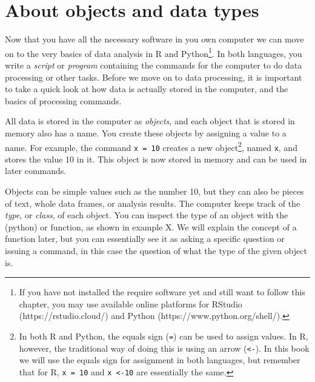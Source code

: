 \newcommand{\fnarrow}{\footnote{In both R and Python, the equals
  sign (\texttt{=}) can be used to assign values. In R, however, the
  traditional way of doing this is using an arrow (\texttt{\textless-}). In
  this book we will use the equals sign for assignment in both
  languages, but remember that for R, \texttt{x = 10} and
  \texttt{x \textless-10} are essentially the same.}}


\section{About objects and data types}
\label{sec:datatypes}

Now that you have all the necessary software in you own computer we
can move on to the very basics of data analysis in R and
Python\footnote{If you have not installed the require software yet and
  still want to follow this chapter, you may use available online
  platforms for RStudio (https://rstudio.cloud/) and Python
  (https://www.python.org/shell/).}.  In both languages, you write a
\emph{script} or \emph{program} containing the commands for the
computer to do data processing or other tasks.  Before we move on to
data processing, it is important to take a quick look at how data is
actually stored in the computer, and the basics of processing
commands.

All data is stored in the computer as \emph{objects}, and each object
that is stored in memory also has a name.  You create these objects by
assigning a value to a name. For example, the command \texttt{x = 10}
creates a new object\fnarrow, named \texttt{x}, and stores the value 10
in it.  This object is now stored in memory and can be used in later
commands.


Objects can be simple values such as the number 10, but they can also
be pieces of text, whole data frames, or analysis results.  The
computer keeps track of the \emph{type}, or \emph{class}, of each
object.  You can inspect the type of an object with the 
(python) or  function, as shown in example X.  We will
explain the concept of a function later, but you can essentially see
it as asking a specific question or issuing a command, in this case
the question of what the type of the given object is.

